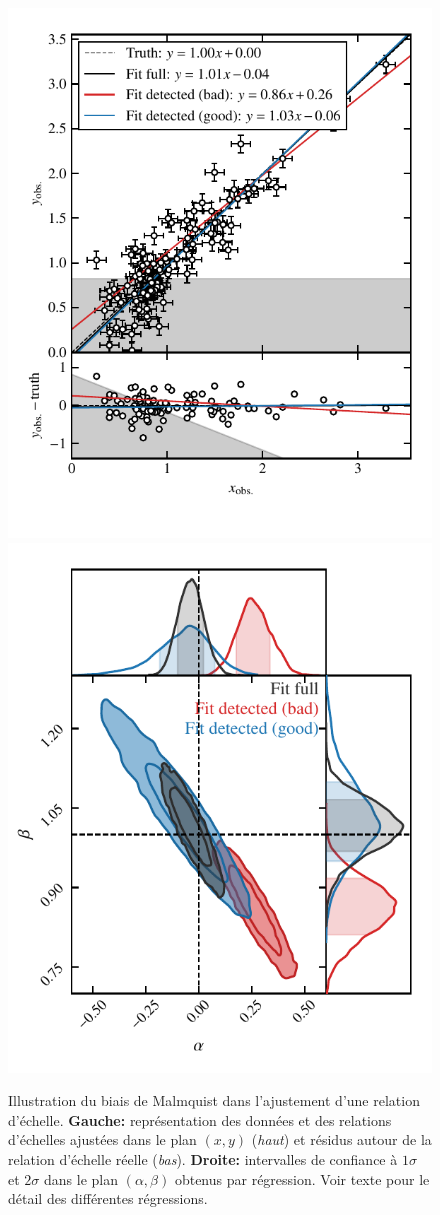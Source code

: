 \begin{figure}[t]
    \centering
    \includegraphics[width=.49\linewidth]{Figures/Chap_scaling/malmquist_effect.pdf}
    \includegraphics[width=.49\linewidth]{Figures/Chap_scaling/malmquist_effect_2.pdf}
    \caption{
        Illustration du biais de Malmquist dans l'ajustement d'une relation d'échelle.
        \textbf{Gauche:} représentation des données et des relations d'échelles ajustées dans le plan $(x, y)$ (\textit{haut}) et résidus autour de la relation d'échelle réelle (\textit{bas}).
        \textbf{Droite:} intervalles de confiance à $1\sigma$ et $2\sigma$ dans le plan $(\alpha, \beta)$ obtenus par régression.
        Voir texte pour le détail des différentes régressions.
    }
    \label{fig:malmquist}
\end{figure}

